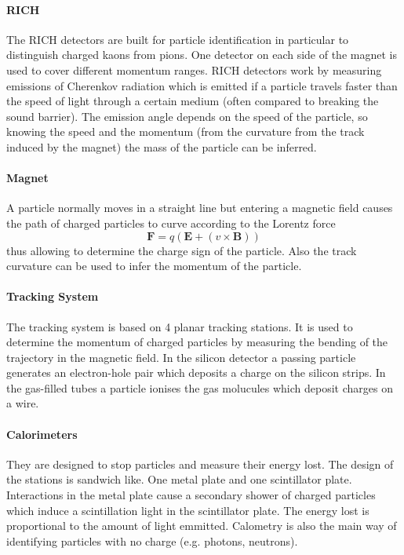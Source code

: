 \documentclass[11pt,twoside]{scrreprt}
\begin{document}
\paragraph{RICH} The RICH detectors are built for particle identification in particular to distinguish charged kaons from pions. 
One detector on each side of the magnet is used to cover different momentum ranges. RICH detectors work by measuring emissions of 
Cherenkov radiation which is emitted if a particle travels faster than the speed of light through a certain medium (often compared 
to breaking the sound barrier). The emission angle depends on the speed of the particle, so knowing the speed and the momentum (from the
curvature from the track induced by the magnet) the mass of the particle can be inferred.

\paragraph{Magnet} A particle normally moves in a straight line but entering a magnetic field causes the path of charged particles to 
curve according to the Lorentz force 
\[
  \mathbf{F} = q\left( \mathbf{E} + \left( v\times\mathbf{B}\right)\right)
\]
thus allowing to determine the charge sign of the particle. Also the track curvature can be used to infer the momentum of the particle.

\paragraph{Tracking System} The tracking system is based on 4 planar tracking stations. It is used to determine the momentum of charged
particles by measuring the bending of the trajectory in the magnetic field. In the silicon detector a passing particle generates an
electron-hole pair which deposits a charge on the silicon strips. In the gas-filled tubes a particle ionises the gas molucules which deposit
charges on a wire.

\paragraph{Calorimeters} They are designed to stop particles and measure their energy lost. The design of the stations is sandwich like. 
One metal plate and one scintillator plate. Interactions in the metal plate cause a secondary shower of charged particles which induce 
a scintillation light in the scintillator plate. The energy lost is proportional to the amount of light emmitted. Calometry is also the 
main way of identifying particles with no charge (e.g. photons, neutrons).
\end{document}
